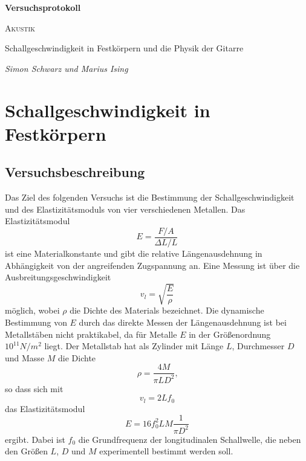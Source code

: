 \documentclass[a4paper, 12pt]{scrartcl}
\begin{document}
\begin{titlepage}
	\centering
	{\Huge\bfseries Versuchsprotokoll\par}
	\vspace{2cm}
	{\scshape\LARGE Akustik \par}
	\vspace{1cm}
	{\Large Schallgeschwindigkeit in Festkörpern und die Physik der Gitarre\par}
	\vfill
	{\large\itshape Simon Schwarz und Marius Ising\par}

	\vfill
\end{titlepage}

\tableofcontents

\section{Schallgeschwindigkeit in Festkörpern}


\subsection{Versuchsbeschreibung}

Das Ziel des folgenden Versuchs ist die Bestimmung der Schallgeschwindigkeit und des Elastizitätsmoduls von vier verschiedenen Metallen. Das Elastizitätsmodul 
$$E = \frac{F/A}{\Delta L/L}$$
ist eine Materialkonstante und gibt die relative Längenausdehnung in Abhängigkeit von der angreifenden Zugspannung an. Eine Messung ist über die Ausbreitungsgeschwindigkeit 
$$v_l = \sqrt{\frac{E}{\rho}}$$
möglich, wobei $\rho$ die Dichte des Materials bezeichnet. Die dynamische Bestimmung von $E$ durch das direkte Messen der Längenausdehnung ist bei Metallstäben nicht praktikabel, da für Metalle $E$ in der Größenordnung $10^{11} N/m^2$ liegt. Der Metallstab hat als Zylinder mit Länge $L$, Durchmesser $D$ und Masse $M$ die Dichte
\begin{equation}\label{eq:rho}
\rho = \frac{4M}{\pi LD^2}\text{,}
\end{equation}
so dass sich mit
\begin{equation}\label{eq:ges}
v_l = 2L f_0
\end{equation}
das Elastizitätsmodul
\begin{equation}\label{eq:ela}
E = 16 f_0^2 LM \frac{1}{\pi D^2}
\end{equation}
ergibt. Dabei ist $f_0$ die Grundfrequenz der longitudinalen Schallwelle, die neben den Größen $L$, $D$ und $M$ experimentell bestimmt werden soll.
\end{document}
